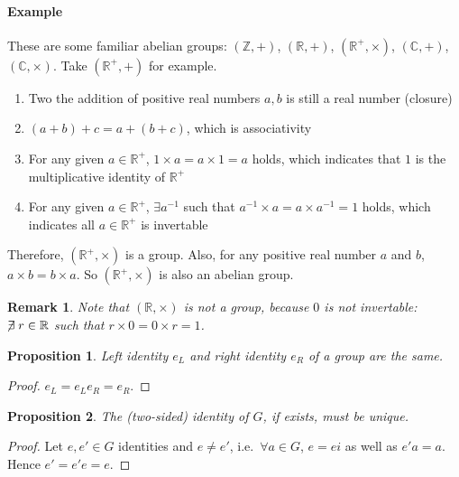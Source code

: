 \documentclass[UTF8]{ctexart}
\theoremstyle{mystyle}
\newtheorem{proposition}{Proposition}[section]
\theoremstyle{myremark}
\newtheorem*{remark}{Remark}
\theoremstyle{plain}
\newcommand{\R}{\mathbb R}
\newcommand{\Z}{\mathbb Z}
\newcommand{\C}{\mathbb C}
\begin{document}
\paragraph{Example}
These are some familiar abelian groups: $ (\Z, +) $, $ (\R, +) $, $ (\R^+, \times) $, $ (\C, +) $, $ (\C, \times) $. Take $ (\R^+, +) $ for example. 

\begin{enumerate}
    \item Two the addition of positive real numbers $ a, b $ is still a real number (closure)
    \item $ (a + b) + c = a + (b + c) $, which is associativity
    \item For any given $ a \in \R^+ $, $ 1 \times a = a \times 1 = a $ holds, which indicates that $ 1 $ is the multiplicative identity of $ \R^+ $
    \item For any given $ a \in \R^+ $, $ \exists a^{-1} $ such that $ a^{-1} \times a = a \times a^{-1} = 1 $ holds, which indicates all $ a \in \R^+ $ is invertable
\end{enumerate}

Therefore, $ (\R^+, \times) $ is a group. Also, for any positive real number $ a $ and $ b $, $ a \times b = b \times a $. So $ (\R^+, \times) $ is also an abelian group.


\begin{remark}
    Note that $ (\R, \times) $ is not a group, because $ 0 $ is not invertable: $ \centernot\exists r \in \R $ such that $ r \times 0 = 0 \times r = 1 $.
\end{remark}


\begin{proposition}
    Left identity $ e_L $ and right identity $ e_R $ of a group are the same.
\end{proposition}

\begin{proof}
    $ e_L = e_L e_R = e_R $.
\end{proof}


\begin{proposition}
    The (two-sided) identity of $ G $, if exists, must be unique.
\end{proposition}

\begin{proof}
    Let $ e, e' \in G $ identities and $ e \neq e' $, i.e.\ $ \forall a \in G $, $ e = e i $ as well as $ e' a = a $. Hence $ e' = e' e = e $.
\end{proof}
\end{document}
